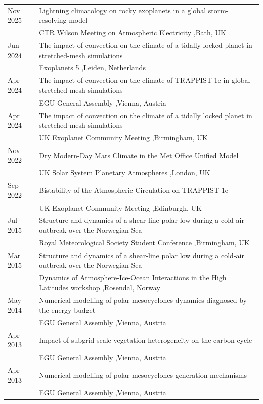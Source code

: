 \documentclass[a4paper, 11pt]{article}
\begin{document}
\begin{tabularx}{\linewidth}{@{}l X@{}}
Nov 2025 & Lightning climatology on rocky exoplanets in a global storm-resolving model \\ & CTR Wilson Meeting on Atmospheric Electricity \sep Bath, UK \\
Jun 2024 & The impact of convection on the climate of a tidally locked planet in stretched-mesh simulations \\ & Exoplanets 5 \sep Leiden, Netherlands \\
Apr 2024 & The impact of convection on the climate of TRAPPIST-1e in global stretched-mesh simulations \\ & EGU General Assembly \sep Vienna, Austria \\
Apr 2024 & The impact of convection on the climate of a tidally locked planet in stretched-mesh simulations \\ & UK Exoplanet Community Meeting \sep Birmingham, UK \\
Nov 2022 & Dry Modern-Day Mars Climate in the Met Office Unified Model \\ & UK Solar System Planetary Atmospheres \sep London, UK \\
Sep 2022 & Bistability of the Atmospheric Circulation on TRAPPIST-1e \\ & UK Exoplanet Community Meeting \sep Edinburgh, UK \\
Jul 2015 & Structure and dynamics of a shear-line polar low during a cold-air outbreak over the Norwegian Sea \\ & Royal Meteorological Society Student Conference \sep Birmingham, UK \\
Mar 2015 & Structure and dynamics of a shear-line polar low during a cold-air outbreak over the Norwegian Sea \\ & Dynamics of Atmosphere-Ice-Ocean Interactions in the High Latitudes workshop \sep Rosendal, Norway \\
May 2014 & Numerical modelling of polar mesocyclones dynamics diagnosed by the energy budget \\ & EGU General Assembly \sep Vienna, Austria \\
Apr 2013 & Impact of subgrid-scale vegetation heterogeneity on the carbon cycle \\ & EGU General Assembly \sep Vienna, Austria \\
Apr 2013 & Numerical modelling of polar mesocyclones generation mechanisms \\ & EGU General Assembly \sep Vienna, Austria \\
\end{tabularx}
\end{document}
